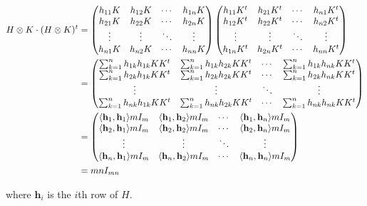 \documentclass[12pt]{amsart}
\begin{document}
\begin{itemize}
\begin{align*}
H\otimes K\cdot (H\otimes K)^t &=
\begin{pmatrix}
h_{11}K & h_{12}K&\cdots & h_{1n}K\\
h_{21}K & h_{22}K&\cdots & h_{2n}K\\
\vdots&\vdots&\ddots&\vdots\\
h_{n1}K & h_{n2}K&\cdots & h_{nn}K\\
\end{pmatrix}
\begin{pmatrix}
h_{11}K^t & h_{21}K^t&\cdots & h_{n1}K^t\\
h_{12}K^t & h_{22}K^t&\cdots & h_{n2}K^t\\
\vdots&\vdots&\ddots&\vdots\\
h_{1n}K^t & h_{2n}K^t&\cdots & h_{nn}K^t\\
\end{pmatrix}\\
&=\begin{pmatrix}
\sum_{k=1}^n h_{1k}h_{1k}KK^t & \sum_{k=1}^n h_{1k}h_{2k}KK^t &\cdots & \sum_{k=1}^n h_{1k}h_{nk}KK^t\\
\sum_{k=1}^n h_{2k}h_{1k}KK^t & \sum_{k=1}^n h_{2k}h_{2k}KK^t &\cdots & \sum_{k=1}^n h_{2k}h_{nk}KK^t\\
\vdots&\vdots&\ddots&\vdots\\
\sum_{k=1}^n h_{nk}h_{1k}KK^t & \sum_{k=1}^n h_{nk}h_{2k}KK^t &\cdots & \sum_{k=1}^n h_{nk}h_{nk}KK^t\\
\end{pmatrix}\\
&= \begin{pmatrix}
\langle\textbf{h}_1,\textbf{h}_1\rangle mI_m & \langle\textbf{h}_1,\textbf{h}_2\rangle mI_m &\cdots & \langle\textbf{h}_1,\textbf{h}_n\rangle mI_m\\
\langle\textbf{h}_2,\textbf{h}_1\rangle mI_m & \langle\textbf{h}_2,\textbf{h}_2\rangle mI_m &\cdots & \langle\textbf{h}_2,\textbf{h}_n\rangle mI_m\\
\vdots&\vdots&\ddots&\vdots\\
\langle\textbf{h}_n,\textbf{h}_1\rangle mI_m & \langle\textbf{h}_n,\textbf{h}_2\rangle mI_m &\cdots & \langle\textbf{h}_n,\textbf{h}_n\rangle mI_m\\
\end{pmatrix}\\
&= mn I_{mn}
\end{align*}

where $\textbf{h}_i$ is the $i$th row of $H$.\\


\end{itemize}
\end{document}
